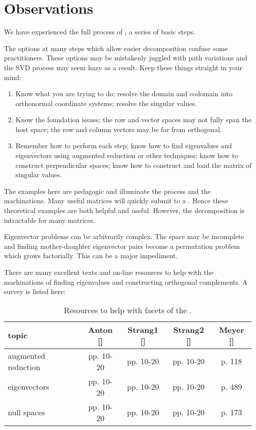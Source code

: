\section{Observations}
We have experienced the full process of \svdl, a series of basic steps. 

The options at many steps which allow easier decomposition confuse some practitioners. These options may be mistakenly juggled with path variations and the SVD process may seem hazy as a result. Keep these things straight in your mind:
\begin{enumerate}
\item Know what you are trying to do;
\subitem resolve the domain and codomain into orthonormal coordinate systems;
\subitem resolve the singular values.
\item Know the foundation issues;
\subitem the row and vector spaces may not fully span the host space;
\subitem the row and column vectors may be far from orthogonal.
\item Remember how to perform each step;
\subitem know how to find eigenvalues and eigenvectors using augmented reduction or other techniques;
\subitem know how to construct perpendicular spaces;
\subitem know how to construct and load the matrix of singular values.
\end{enumerate}

The examples here are pedagogic and illuminate the process and the machinations. Many useful matrices will quickly submit to a \svdl. Hence these theoretical examples are both helpful and useful. However, the decomposition is intractable for many matrices.

Eigenvector problems can be arbitrarily complex. The space may be incomplete and finding mother-daughter eigenvector pairs become a permutation problem which grows factorially. This can be a major impediment.

There are many excellent texts and on-line resources to help with the machinations of finding eigenvalues and constructing orthogonal complements. A survey is listed here:

\begin{table}[htdp]
\begin{center}
\begin{tabular}{lcccc}
  topic & Anton [] & Strang1 [] & Strang2 [] & Meyer \cite{Meyer} [] \\\hline
  augmented reduction & pp. 10-20 & pp. 10-20 & pp. 10-20 & p. 118\\
  eigenvectors & pp. 10-20 & pp. 10-20 & pp. 10-20 & p. 489\\
  null spaces  & pp. 10-20 & pp. 10-20 & pp. 10-20 & p. 173
\end{tabular}
\end{center}
\label{default}
\caption{Resources to help with facets of the \svdl.}
\end{table}


\endinput